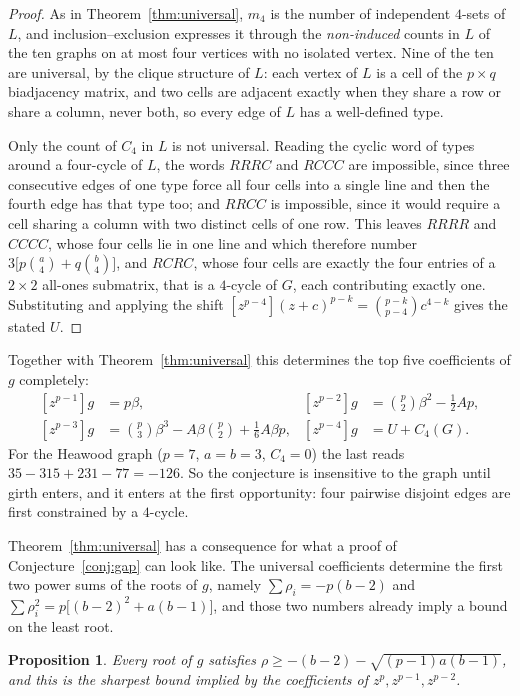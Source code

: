 \documentclass[11pt]{article}
\newtheorem{proposition}[theorem]{Proposition}
\theoremstyle{remark}
\begin{document}
\begin{proof}
As in Theorem~\ref{thm:universal}, $m_4$ is the number of independent $4$-sets of
$L$, and inclusion--exclusion expresses it through the \emph{non-induced} counts
in $L$ of the ten graphs on at most four vertices with no isolated vertex. Nine
of the ten are universal, by the clique structure of $L$: each vertex of $L$ is a
cell of the $p\times q$ biadjacency matrix, and two cells are adjacent exactly
when they share a row or share a column, never both, so every edge of $L$ has a
well-defined type.

Only the count of $C_4$ in $L$ is not universal. Reading the cyclic word of types
around a four-cycle of $L$, the words $RRRC$ and $RCCC$ are impossible, since
three consecutive edges of one type force all four cells into a single line and
then the fourth edge has that type too; and $RRCC$ is impossible, since it would
require a cell sharing a column with two distinct cells of one row. This leaves
$RRRR$ and $CCCC$, whose four cells lie in one line and which therefore number
$3\bigl[p\binom a4+q\binom b4\bigr]$, and $RCRC$, whose four cells are exactly
the four entries of a $2\times2$ all-ones submatrix, that is a $4$-cycle of $G$,
each contributing exactly one. Substituting and applying the shift
$[z^{p-4}](z+c)^{p-k}=\binom{p-k}{p-4}c^{4-k}$ gives the stated $U$.
\end{proof}

Together with Theorem~\ref{thm:universal} this determines the top five
coefficients of $g$ completely:
\[
\begin{aligned}
{}[z^{p-1}]g&=p\beta, &
[z^{p-2}]g&=\binom p2\beta^2-\tfrac12Ap,\\
[z^{p-3}]g&=\binom p3\beta^3-A\beta\binom p2+\tfrac16A\beta p, &
[z^{p-4}]g&=U+C_4(G).
\end{aligned}
\]
For the Heawood graph ($p=7$, $a=b=3$, $C_4=0$) the last reads
$35-315+231-77=-126$. So the conjecture is insensitive to the graph until girth
enters, and it enters at the first opportunity: four pairwise disjoint edges are
first constrained by a $4$-cycle.

Theorem~\ref{thm:universal} has a consequence for what a proof of
Conjecture~\ref{conj:gap} can look like. The universal coefficients determine the
first two power sums of the roots of $g$, namely
$\sum\rho_i=-p(b-2)$ and $\sum\rho_i^2=p\bigl[(b-2)^2+a(b-1)\bigr]$, and those
two numbers already imply a bound on the least root.

\begin{proposition}\label{prop:moments}
Every root of $g$ satisfies
$\rho\ge-(b-2)-\sqrt{(p-1)a(b-1)}$, and this is the sharpest bound implied by
the coefficients of $z^p,z^{p-1},z^{p-2}$.
\end{proposition}
\end{document}
